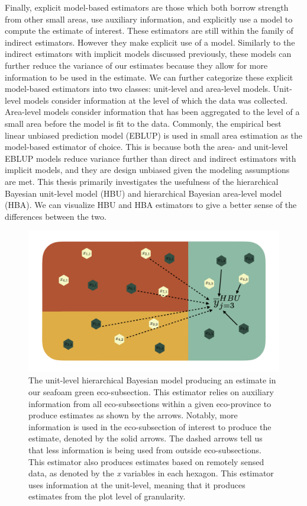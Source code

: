 \documentclass[12pt,twoside]{reedthesis}
\begin{document}
Finally, explicit model-based estimators are those which both borrow strength from other small areas, use auxiliary information, and explicitly use a model to compute the estimate of interest. These estimators are still within the family of indirect estimators. However they make explicit use of a model. Similarly to the indirect estimators with implicit models discussed previously, these models can further reduce the variance of our estimates because they allow for more information to be used in the estimate. We can further categorize these explicit model-based estimators into two classes: unit-level and area-level models. Unit-level models consider information at the level of which the data was collected. Area-level models consider information that has been aggregated to the level of a small area before the model is fit to the data. Commonly, the empirical best linear unbiased prediction model (EBLUP) is used in small area estimation as the model-based estimator of choice. This is because both the area- and unit-level EBLUP models reduce variance further than direct and indirect estimators with implicit models, and they are design unbiased given the modeling assumptions are met. This thesis primarily investigates the usefulness of the hierarchical Bayesian unit-level model (HBU) and hierarchical Bayesian area-level model (HBA). We can visualize HBU and HBA estimators to give a better sense of the differences between the two.
\begin{figure}

{\centering \includegraphics[width=1\linewidth]{figure/hbu-diagram} 

}

\caption[The unit-level hierarchical Bayesian model]{The unit-level hierarchical Bayesian model producing an estimate in our seafoam green eco-subsection. This estimator relies on auxiliary information from all eco-subsections within a given eco-province to produce estimates as shown by the arrows. Notably, more information is used in the eco-subsection of interest to produce the estimate, denoted by the solid arrows. The dashed arrows tell us that less information is being used from outside eco-subsections. This estimator also produces estimates based on remotely sensed data, as denoted by the \textit{x} variables in each hexagon. This estimator uses information at the unit-level, meaning that it produces estimates from the plot level of granularity.}\label{fig:hbu-diagram}
\end{figure}
\end{document}
